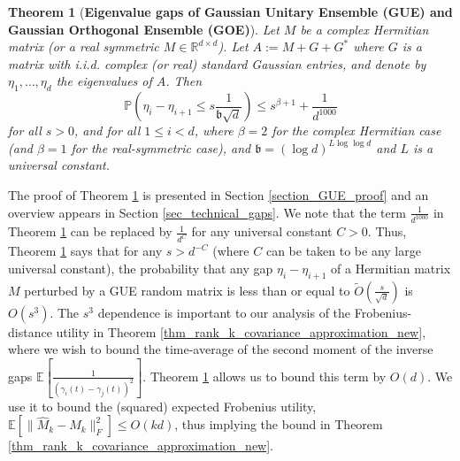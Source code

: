 \documentclass[11pt,letterpaper]{article}
\newtheorem{theorem}{Theorem}[section]
\begin{document}
\begin{theorem}[\bf Eigenvalue gaps of  Gaussian Unitary Ensemble (GUE) and Gaussian Orthogonal Ensemble (GOE)]\label{thm:eigenvalue_gap}
%
%
Let $M$ be a complex Hermitian matrix (or a real symmetric $M \in \mathbb{R}^{d \times d}$).
%
Let $A := M + G + G^\ast$ where $G$ is a matrix with i.i.d. complex (or real) standard Gaussian entries, and denote by $\eta_1,\ldots, \eta_d$ the eigenvalues of $A$.
%
Then
%
%
$$
    \mathbb{P}\left(\eta_i - \eta_{i+1} \leq s \frac{1}{\mathfrak{b}\sqrt{d}}\right) \leq s^{\beta +1} + \frac{1}{d^{1000}}$$ for all $s>0$, and for all $1\leq i < d$,
where $\beta=2$ for the complex Hermitian case (and $\beta=1$ for the real-symmetric case), and $\mathfrak{b} = (\log d)^{ L\log \log d}$ and $L$ is a universal constant.    
\end{theorem}
%
\noindent
The proof of Theorem \ref{thm:eigenvalue_gap} is presented in Section \ref{section_GUE_proof} and an overview appears in Section \ref{sec_technical_gaps}.
%
We note that the term $\frac{1}{d^{1000}}$ in Theorem \ref{thm:eigenvalue_gap}  can be replaced by $\frac{1}{d^C}$ for any universal constant $C>0$.
%
Thus, Theorem \ref{thm:eigenvalue_gap} says that for any $s> d^{-C}$ (where $C$ can be taken to be any large universal constant), the probability that any gap $\eta_i- \eta_{i+1}$ of a Hermitian matrix $M$ perturbed by a GUE random matrix is less than or equal to $\tilde{O}\left(\frac{s}{\sqrt{d}}\right)$ is $O(s^3)$.
%
The $s^3$ dependence is important to our analysis of the Frobenius-distance utility in Theorem  \ref{thm_rank_k_covariance_approximation_new},  where we wish to bound the time-average of the second moment of the inverse gaps $\mathbb{E}\left[\frac{1}{(\gamma_i(t) - \gamma_j(t))^2}\right]$.
% 
Theorem \ref{thm:eigenvalue_gap} allows us to bound this term by $O(d)$.
% 
We use it to bound the (squared) expected Frobenius utility, $\mathbb{E}[\|\hat{M}_k -  M_k \|_F^2] \leq O(kd)$, thus implying the bound in Theorem \ref{thm_rank_k_covariance_approximation_new}.
%
\end{document}
